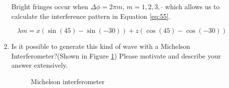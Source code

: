 \documentclass[main.tex]{subfiles}
\begin{document}
\begin{enumerate}
\begin{enumerate}
Bright fringes occur when $\Delta \phi = 2\pi m$, $m=1,2,3,\cdot$ which allows us to calculate the interference pattern in Equation \ref{eq:55}.

\begin{equation}\label{eq:55}
\lambda m =  x(\sin(45)-\sin(-30)) + z(\cos(45)-\cos(-30))
\end{equation}

\item Is it possible to generate this kind of wave with a Michelson Interferometer?(Shown in Figure \ref{fig:53}) Please motivate and describe your answer extensively.

\begin{figure}
\centering{}
\caption{Michelson interferometer}
\label{fig:53}
\end{figure}



\end{enumerate}
\end{enumerate}
\end{document}
